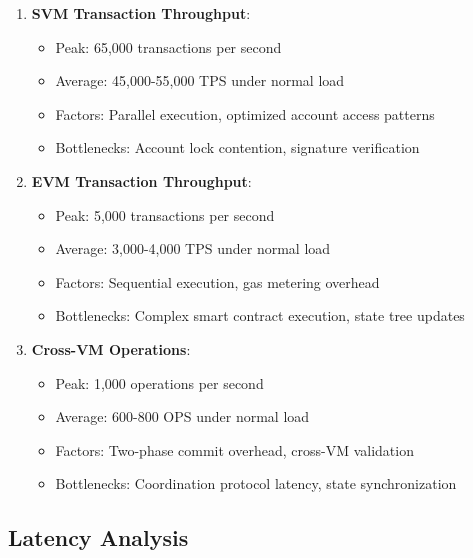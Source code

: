 \documentclass[11pt,a4paper]{article}
\begin{document}
\begin{enumerate}
    \item \textbf{SVM Transaction Throughput}: 
    \begin{itemize}
        \item Peak: 65,000 transactions per second
        \item Average: 45,000-55,000 TPS under normal load
        \item Factors: Parallel execution, optimized account access patterns
        \item Bottlenecks: Account lock contention, signature verification
    \end{itemize}
    
    \item \textbf{EVM Transaction Throughput}: 
    \begin{itemize}
        \item Peak: 5,000 transactions per second
        \item Average: 3,000-4,000 TPS under normal load
        \item Factors: Sequential execution, gas metering overhead
        \item Bottlenecks: Complex smart contract execution, state tree updates
    \end{itemize}
    
    \item \textbf{Cross-VM Operations}: 
    \begin{itemize}
        \item Peak: 1,000 operations per second
        \item Average: 600-800 OPS under normal load
        \item Factors: Two-phase commit overhead, cross-VM validation
        \item Bottlenecks: Coordination protocol latency, state synchronization
    \end{itemize}
\end{enumerate}

\subsection{Latency Analysis}
\end{document}
